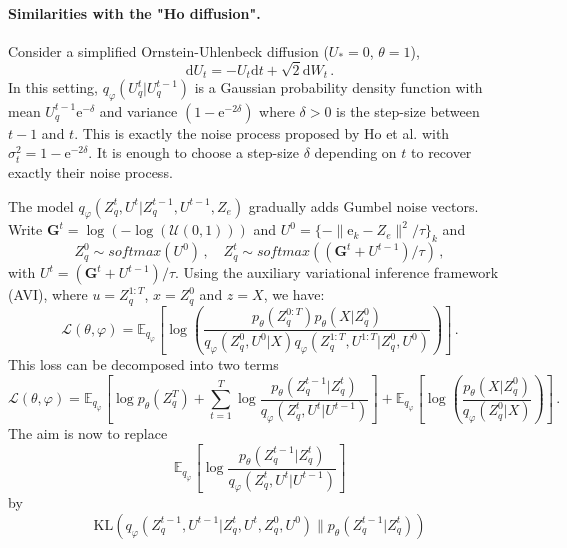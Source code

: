 \documentclass{article}
\newcommand{\rme}{\mathrm{e}}
\begin{document}
\paragraph{Similarities with the "Ho diffusion". }
Consider a simplified Ornstein-Uhlenbeck diffusion ($U_* = 0$, $\theta = 1$),
$$
\mathrm{d}U_t = -U_t\mathrm{d}t + \sqrt{2}\mathrm{d}W_t\,.
$$
 In this setting, $q_\varphi(U_q^{t}|U_q^{t-1})$ is a Gaussian probability density function with mean $U_q^{t-1}\mathrm{e}^{-\delta}$ and variance $(1-\mathrm{e}^{-2\delta})$ where $\delta>0$ is the step-size between $t-1$ and $t$. This is exactly the noise process proposed by Ho et al. with $\sigma^2_t = 1 - \mathrm{e}^{-2\delta}$. It is enough to choose a step-size $\delta$ depending on  $t$ to recover exactly their noise process.

\clearpage
\newpage


The model $q_{\varphi}(Z_q^t ,U^t| Z_q^{t-1},U^{t-1}, Z_e)$ gradually adds Gumbel noise vectors. Write  $\mathbf{G}^t = \log(-\log(\mathcal{U}(0,1)))$ and $U^0 = \{- \| \rme_k - Z_e\|^2/ \tau\}_k $ and
$$
Z_q^0 \sim softmax(U^0 )\,, \quad Z_q^t \sim softmax((\mathbf{G}^t +U^{t-1}) / \tau)\,,
$$
with $U^t = (\mathbf{G}^t +U^{t-1}) / \tau$. Using the auxiliary variational inference framework (AVI), where $u = Z_q^{1:T}$, $x = Z_q^0$ and $z = X$, we have:
$$
\mathcal{L}(\theta, \varphi) = \mathbb{E}_{q_\varphi} \left[ \log\left(\frac{p_\theta(Z_q^{0:T})p_\theta(X|Z_q^0)}{q_\varphi(Z_q^0,U^0|X) q_\varphi(Z_q^{1:T},U^{1:T}|Z_q^0,U^0)}\right) \right]\,.
$$
This loss can be decomposed into two terms
$$
\mathcal{L}(\theta, \varphi) = \mathbb{E}_{q_\varphi} \left[\log p_\theta(Z_q^T) + \sum_{t=1}^T\log  \frac{p_\theta(Z_q^{t-1}|Z_q^t)}{q_\varphi(Z_q^{t},U^t|U^{t-1})} \right] + \mathbb{E}_{q_\varphi} \left[ \log\left(\frac{p_\theta(X|Z_q^0)}{q_\varphi(Z_q^0|X)}\right) \right]\,.
$$
The aim is now to replace
$$
 \mathbb{E}_{q_\varphi} \left[\log  \frac{p_\theta(Z_q^{t-1}|Z_q^t)}{q_\varphi(Z_q^{t},U^t|U^{t-1})} \right]
$$
by
$$
\mathrm{KL}(q_\varphi(Z_q^{t-1},U^{t-1}|Z_q^t,U^{t},Z_q^0,U^{0})\|p_\theta(Z_q^{t-1}|Z_q^t))
$$
\clearpage
\newpage
\end{document}
